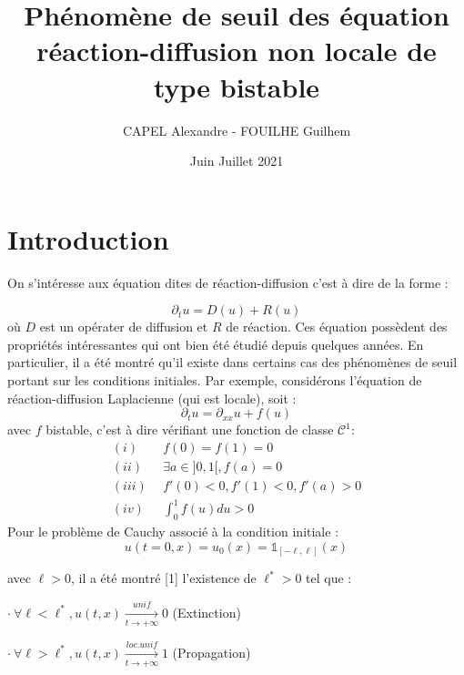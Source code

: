 \documentclass{article}
\title{Phénomène de seuil des équation réaction-diffusion non locale de type bistable}
\author{CAPEL Alexandre - FOUILHE Guilhem}
\date{Juin Juillet 2021}
\begin{document}
\maketitle
\newtheorem{Theoreme}{Théorème}[section]
\newtheorem{Lemme}[Theoreme]{Lemme}




\section{Introduction}
\indent On s'intéresse aux équation dites de réaction-diffusion c'est à dire de la forme : 


\begin{equation}
	\partial _t u = D(u) + R(u)
\end{equation}
où $D$ est un opérater de diffusion et $R$ de réaction.\newline
\indent Ces équation possèdent des propriétés intéressantes qui ont bien été étudié depuis quelques années. En particulier, il a été montré qu'il existe dans certains cas des phénomènes de seuil portant sur les conditions initiales. Par exemple, considérons l'équation de réaction-diffusion Laplacienne (qui est locale), soit : 
\begin{equation}
	\partial_t u = \partial_{xx} u+f(u)
\end{equation}
avec $f$ bistable, c'est à dire vérifiant une fonction de classe $\mathcal{C}^1$: 
\begin{equation*}
\begin{split}
(i)~~&f(0) = f(1) = 0 \\
(ii)~~&\exists a \in ]0,1[, f(a) = 0 \\
(iii)~~&f'(0)<0 , f'(1)<0, f'(a)>0 \\
(iv)~~ &\int_0^1 f(u)du >0
\end{split}
\end{equation*}
Pour le problème de Cauchy associé à la condition initiale : 
\begin{equation}
u(t=0,x) = u_0(x) = \mathds{1}_{[-\ell,\ell]}(x) 
\end{equation}

\noindent avec $\ell >0$, il a été montré [1] l'existence de $\ell^* >0$ tel que :

$\cdot~ \forall \ell < \ell^* , u(t,x) \underset{t \to +\infty}{\overset{unif}{\longrightarrow}}0$ (Extinction)

$\cdot ~\forall \ell > \ell^* , u(t,x) \underset{t \to +\infty}{\overset{loc. unif}{\longrightarrow}}1$ (Propagation)
\end{document}
